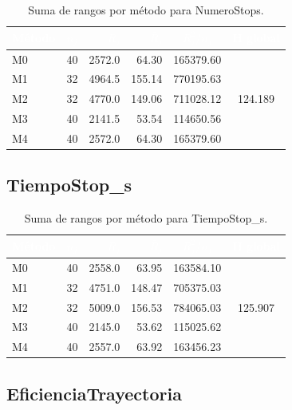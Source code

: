 \documentclass[12pt,a4paper,oneside]{book}
\begin{document}
\begin{table}[H]
\centering
\small
\caption{Suma de rangos por método para NumeroStops.}
\begin{tabular}{lcrrcc}
\toprule
\rowcolor{primary}
\textcolor{white}{\textbf{Método}} & \textcolor{white}{$n_j$} & \textcolor{white}{$R_j$} & \textcolor{white}{$\bar{R}_j$} & \textcolor{white}{$R_j^2/n_j$} & \textcolor{white}{H global} \\
\midrule
M0 & 40 & 2572.0 & 64.30 & 165379.60 & \multirow{5}{*}{124.189} \\
M1 & 32 & 4964.5 & 155.14 & 770195.63 & \\
M2 & 32 & 4770.0 & 149.06 & 711028.12 & \\
M3 & 40 & 2141.5 & 53.54 & 114650.56 & \\
M4 & 40 & 2572.0 & 64.30 & 165379.60 & \\
\bottomrule
\end{tabular}
\end{table}

\subsection{TiempoStop\_s}

\begin{table}[H]
\centering
\small
\caption{Suma de rangos por método para TiempoStop\_s.}
\begin{tabular}{lcrrcc}
\toprule
\rowcolor{primary}
\textcolor{white}{\textbf{Método}} & \textcolor{white}{$n_j$} & \textcolor{white}{$R_j$} & \textcolor{white}{$\bar{R}_j$} & \textcolor{white}{$R_j^2/n_j$} & \textcolor{white}{H global} \\
\midrule
M0 & 40 & 2558.0 & 63.95 & 163584.10 & \multirow{5}{*}{125.907} \\
M1 & 32 & 4751.0 & 148.47 & 705375.03 & \\
M2 & 32 & 5009.0 & 156.53 & 784065.03 & \\
M3 & 40 & 2145.0 & 53.62 & 115025.62 & \\
M4 & 40 & 2557.0 & 63.92 & 163456.23 & \\
\bottomrule
\end{tabular}
\end{table}

\subsection{EficienciaTrayectoria}
\end{document}

